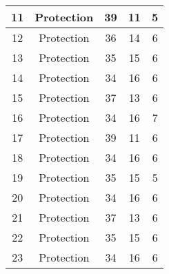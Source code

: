 \documentclass[results.tex]{subfiles}
\begin{document}
\begin{center}
\begin{tabular}{| c || c | c | c | c |}
            \hline
            11                      & Protection                   & 39                     & 11                      & 5                    \\
            \hline
            12                      & Protection                   & 36                     & 14                      & 6                    \\
            \hline
            13                      & Protection                   & 35                     & 15                      & 6                    \\
            \hline
            14                      & Protection                   & 34                     & 16                      & 6                    \\
            \hline
            15                      & Protection                   & 37                     & 13                      & 6                    \\
            \hline
            16                      & Protection                   & 34                     & 16                      & 7                    \\
            \hline
            17                      & Protection                   & 39                     & 11                      & 6                    \\
            \hline
            18                      & Protection                   & 34                     & 16                      & 6                    \\
            \hline
            19                      & Protection                   & 35                     & 15                      & 5                    \\
            \hline
            20                      & Protection                   & 34                     & 16                      & 6                    \\
            \hline
            21                      & Protection                   & 37                     & 13                      & 6                    \\
            \hline
            22                      & Protection                   & 35                     & 15                      & 6                    \\
            \hline
            23                      & Protection                   & 34                     & 16                      & 6                    \\

\end{tabular}
\end{center}
\end{document}
